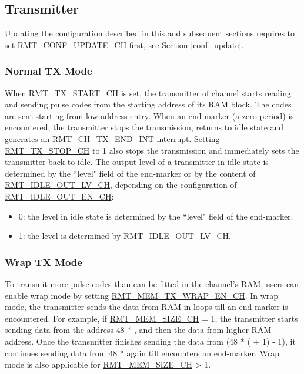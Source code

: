 \documentclass[main\_\_EN.tex]{subfiles}
\begin{document}
\subsection{Transmitter}
\begin{tiplisting}
Updating the configuration described in this and subsequent sections requires to set \hyperref[fielddesc:RMTCONFUPDATECHN]{RMT\_CONF\_UPDATE\_CH} first, see Section \ref{conf_update}.
\end{tiplisting}

\subsubsection{Normal TX Mode}\label{sec:normal-tx-mode}

When \hyperref[fielddesc:RMTTXSTARTCHN]{RMT\_TX\_START\_CH} is set, the transmitter of channel  starts reading and sending pulse codes from the starting address of its RAM block. The codes are sent starting from low-address entry. When an end-marker (a zero period) is encountered, the transmitter stops the transmission, returns to idle state and generates an \hyperref[int:RMTCHnTXENDINT]{RMT\_CH\_TX\_END\_INT} interrupt. Setting \hyperref[fielddesc:RMTTXSTOPCHN]{RMT\_TX\_STOP\_CH} to 1 also stops the transmission and immediately sets the transmitter back to idle. The output level of a transmitter in idle state is determined by the ``level" field of the end-marker or by the content of \hyperref[fielddesc:RMTIDLEOUTLVCHN]{RMT\_IDLE\_OUT\_LV\_CH}, depending on the configuration of  \hyperref[fielddesc:RMTIDLEOUTENCHN]{RMT\_IDLE\_OUT\_EN\_CH}:
\begin{itemize}
    \item 0: the level in idle state is determined by the ``level" field of the end-marker.
    \item 1: the level is determined by \hyperref[fielddesc:RMTIDLEOUTLVCHN]{RMT\_IDLE\_OUT\_LV\_CH}.
\end{itemize}


\subsubsection{Wrap TX Mode}\label{sec:wrap-tx-mode}

To transmit more pulse codes than can be fitted in the channel's RAM, users can enable wrap mode by setting \hyperref[fielddesc:RMTMEMTXWRAPENCHN]{RMT\_MEM\_TX\_WRAP\_EN\_CH}. In wrap mode, the transmitter sends the data from RAM in loops till an end-marker is encountered. For example, if \hyperref[fielddesc:RMTMEMSIZECHN]{RMT\_MEM\_SIZE\_CH} = 1, the transmitter starts sending data from the address 48 * , and then the data from higher RAM address. Once the transmitter finishes sending the data from (48 * ( + 1) - 1), it continues sending data from 48 *  again till encounters an end-marker. Wrap mode is also applicable for \hyperref[fielddesc:RMTMEMSIZECHN]{RMT\_MEM\_SIZE\_CH} > 1.
\end{document}
